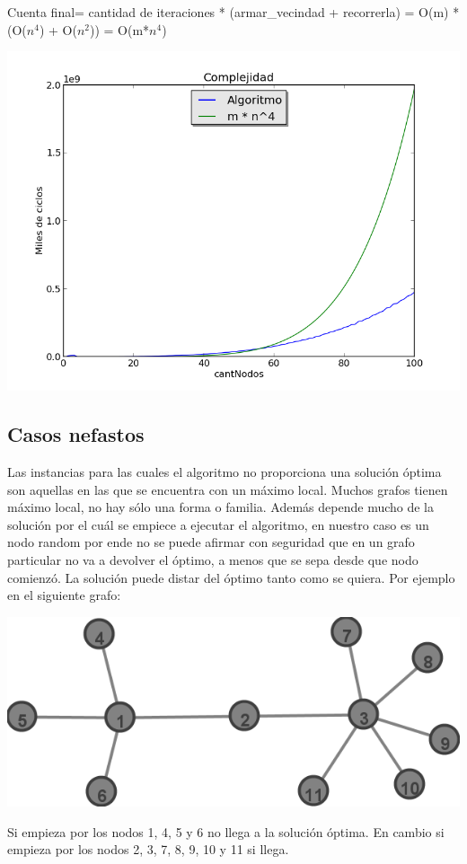 Cuenta final= cantidad de iteraciones * (armar\_vecindad + recorrerla) = O(m) * (O($n^4$) + O($n^2$)) = O(m*$n^4$)
\begin{center}
\includegraphics[scale=0.8]{Images/complejidad.png} 
\end{center}

\subsection{Casos nefastos}
Las instancias para las cuales el algoritmo no proporciona una solución óptima son aquellas en las que se encuentra con un máximo local. Muchos grafos tienen máximo local, no hay sólo una forma o familia. Además depende mucho de la solución por el cuál se empiece a ejecutar el algoritmo, en nuestro caso es un nodo random por ende no se puede afirmar con seguridad que en un grafo particular no va a devolver el óptimo, a menos que se sepa desde que nodo comienzó.
La solución puede distar del óptimo tanto como se quiera.
Por ejemplo en el siguiente grafo:

\begin{center}
\includegraphics[scale=0.5]{Images/ejemploCasoMaloLocal.png} 
\end{center}

Si empieza por los nodos 1, 4, 5 y 6 no llega a la solución óptima.
En cambio si empieza por los nodos 2, 3, 7, 8, 9, 10 y 11 si llega.






